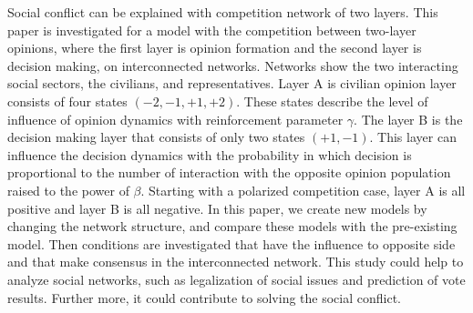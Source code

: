 \begin{bigabstract}
Social conflict can be explained with competition network of two layers. This paper is investigated for a model with the competition between two-layer opinions, where the first layer is opinion formation and the second layer is decision making, on interconnected networks. Networks show the two interacting social sectors, the civilians, and representatives. Layer A is civilian opinion layer consists of four states $(-2, -1, +1, +2)$. These states describe the level of influence of opinion dynamics with reinforcement parameter $\gamma$. The layer B is the decision making layer that consists of only two states $(+1, -1)$.  This layer can influence the decision dynamics with the probability in which decision is proportional to the number of interaction with the opposite opinion population raised to the power of $\beta$. Starting with a polarized competition case, layer A is all positive and layer B is all negative. In this paper, we create new models by changing the network structure, and compare these models with the pre-existing model. Then conditions are investigated that have the influence to opposite side and that make consensus in the interconnected network. This study could help to analyze social networks, such as legalization of social issues and prediction of vote results. Further more, it could contribute to solving the social conflict.
\end{bigabstract}